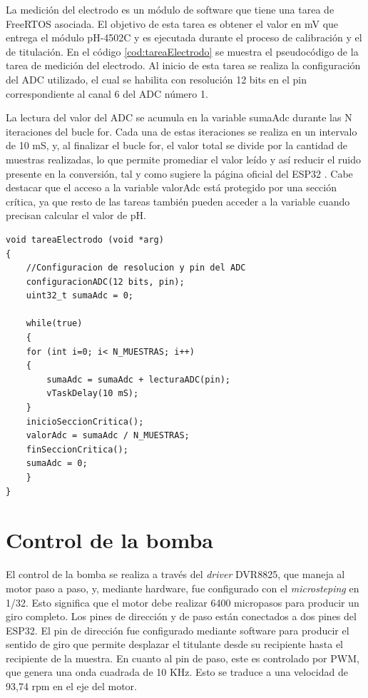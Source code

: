 La medición del electrodo es un módulo de software que tiene una tarea de FreeRTOS asociada. El objetivo de esta tarea es obtener el valor en mV que entrega el módulo pH-4502C y es ejecutada durante el proceso de calibración y el de titulación. En el código \ref{cod:tareaElectrodo} se muestra el pseudocódigo de la tarea de medición del electrodo. Al inicio de esta tarea se realiza la configuración del ADC utilizado, el cual se habilita con resolución 12 bits en el pin correspondiente al canal 6 del ADC número 1.

La lectura del valor del ADC se acumula en la variable sumaAdc durante las N iteraciones del bucle for. Cada una de estas iteraciones se realiza en un intervalo de 10 mS, y, al finalizar el bucle for, el valor total se divide por la cantidad de muestras realizadas, lo que permite promediar el valor leído y así reducir el ruido presente en la conversión, tal y como sugiere la página oficial del ESP32 \citep{WEBSITE:2}. Cabe destacar que el acceso a la variable valorAdc está protegido por una sección crítica, ya que resto de las tareas también pueden acceder a la variable cuando precisan calcular el valor de pH.

\begin{lstlisting}[label=cod:tareaElectrodo,caption=Pseudocódigo de la tarea de medición de pH.]
void tareaElectrodo (void *arg)
{
    //Configuracion de resolucion y pin del ADC
    configuracionADC(12 bits, pin);
    uint32_t sumaAdc = 0;

    while(true)
    {
    for (int i=0; i< N_MUESTRAS; i++)
    {
        sumaAdc = sumaAdc + lecturaADC(pin);  
        vTaskDelay(10 mS);
    } 
    inicioSeccionCritica(); 
    valorAdc = sumaAdc / N_MUESTRAS;
    finSeccionCritica();
    sumaAdc = 0;
    }
}
\end{lstlisting}

\section{Control de la bomba}

El control de la bomba se realiza a través del \textit{driver} DVR8825, que maneja al motor paso a paso, y, mediante hardware, fue configurado con el \textit{microsteping} en 1/32. Esto significa que el motor debe realizar 6400 micropasos para producir un giro completo. Los pines de dirección y de paso están conectados a dos pines del ESP32. El pin de dirección fue configurado mediante software para producir el sentido de giro que permite desplazar el titulante desde su recipiente hasta el recipiente de la muestra. En cuanto al pin de paso, este es controlado por PWM, que genera una onda cuadrada de 10 KHz. Esto se traduce a una velocidad de 93,74 rpm en el eje del motor.


